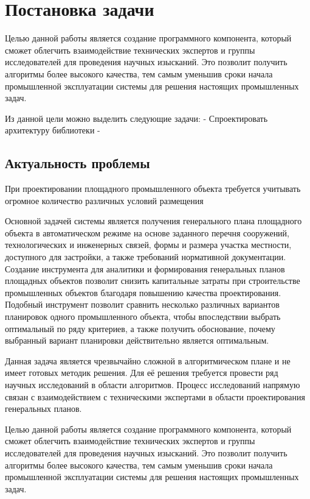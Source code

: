 \section*{\Large{Постановка задачи}}





Целью данной работы является создание программного компонента,
который сможет облегчить взаимодействие технических экспертов
и группы исследователей для проведения научных изысканий.
Это позволит получить алгоритмы более высокого качества,
тем самым уменьшив сроки начала промышленной эксплуатации системы для решения настоящих промышленных задач.




Из данной цели можно выделить следующие задачи:
 - Спроектировать архитектуру библиотеки
 -

\subsection*{\large{Актуальность проблемы}}

При проектировании площадного промышленного объекта требуется учитывать огромное количество различных
условий размещения


Основной задачей системы является получения генерального
плана площадного объекта в автоматическом режиме
на основе заданного перечня сооружений,
технологических и инженерных связей, формы и размера участка местности,
доступного для застройки, а также требований нормативной документации.
Создание инструмента для аналитики и формирования генеральных планов
площадных объектов позволит снизить капитальные затраты
при строительстве промышленных объектов благодаря повышению качества проектирования.
Подобный инструмент позволит сравнить несколько различных вариантов планировок
одного промышленного объекта, чтобы впоследствии выбрать оптимальный по ряду критериев,
а также получить обоснование, почему выбранный вариант планировки действительно является оптимальным.




Данная задача является чрезвычайно сложной в алгоритмическом плане и не имеет готовых методик решения.
Для её решения требуется провести ряд научных исследований в области алгоритмов.
Процесс исследований напрямую связан с взаимодействием
с техническими экспертами в области проектирования генеральных планов.


Целью данной работы является создание программного компонента, который сможет облегчить взаимодействие 
технических экспертов и группы исследователей для проведения научных изысканий. 
Это позволит получить алгоритмы более высокого качества, 
тем самым уменьшив сроки начала промышленной эксплуатации системы для решения настоящих промышленных задач.